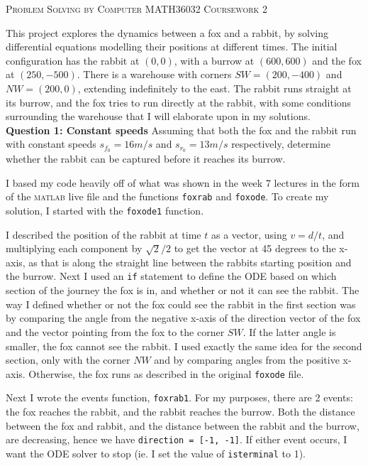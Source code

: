 \documentclass[a4paper,12pt]{article}
\begin{document}
\begin{center}
\Large\textsc{Problem Solving by Computer MATH36032}
\Large\textsc{Coursework 2}
\end{center}

This project explores the dynamics between a fox and a rabbit, by solving differential equations modelling their positions at different times. The initial configuration has the rabbit at $(0,0)$, with a burrow at $(600,600)$ and the fox at $(250,-500)$. There is a warehouse with corners $SW=(200,-400)$ and $NW=(200,0)$, extending indefinitely to the east. The rabbit runs straight at its burrow, and the fox tries to run directly at the rabbit, with some conditions surrounding the warehouse that I will elaborate upon in my solutions.\\

\noindent\textbf{Question 1: Constant speeds} \hspace{0.25cm} Assuming that both the fox and the rabbit run with constant speeds $s_{f_0}=16m/s$ and $s_{r_0}=13m/s$ respectively, determine whether the rabbit can be captured before it reaches its burrow.


I based my code heavily off of what was shown in the week 7 lectures in the form of the \textsc{matlab} live file and the functions \verb!foxrab! and \verb!foxode!. To create my solution, I started with the \verb!foxode1! function. 

I described the position of the rabbit at time $t$ as a vector, using $v=d/t$, and multiplying each component by $\sqrt{2}/2$ to get the vector at 45 degrees to the x-axis, as that is along the straight line between the rabbits starting position and the burrow. Next I used an \verb!if! statement to define the ODE based on which section of the journey the fox is in, and whether or not it can see the rabbit. The way I defined whether or not the fox could see the rabbit in the first section was by comparing the angle from the negative x-axis of the direction vector of the fox and the vector pointing from the fox to the corner $SW$. If the latter angle is smaller, the fox cannot see the rabbit. I used exactly the same idea for the second section, only with the corner $NW$ and by comparing angles from the positive x-axis. Otherwise, the fox runs as described in the original \verb!foxode! file.
\newpage


Next I wrote the events function, \verb!foxrab1!. For my purposes, there are 2 events: the fox reaches the rabbit, and the rabbit reaches the burrow. Both the distance between the fox and rabbit, and the distance between the rabbit and the burrow, are decreasing, hence we have \verb!direction = [-1, -1]!. If either event occurs, I want the ODE solver to stop (ie. I set the value of \verb!isterminal! to 1).

\end{document}
